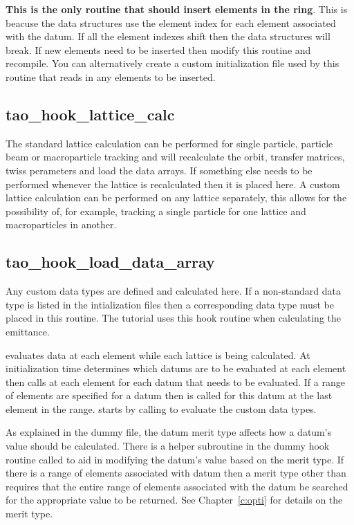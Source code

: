 \textbf{This is the only routine that should insert elements in the ring}. This
is beacuse the \tao data structures use the element index for each element
associated with the datum. If all the element indexes shift then the data
structures will break. If new elements need to be inserted then modify this
routine and recompile. You can alternatively create a custom initialization file
used by this routine that reads in any elements to be inserted.

\subsection{tao\_hook\_lattice\_calc}

The standard lattice calculation can be performed for single particle, particle
beam or macroparticle tracking and will recalculate the orbit, transfer
matrices, twiss perameters and load the data arrays. If something else needs to
be performed whenever the lattice is recalculated then it is placed here. A
custom lattice calculation can be performed on any lattice separately, this
allows for the possibility of, for example, tracking a single particle for one
lattice and macroparticles in another.

\subsection{tao\_hook\_load\_data\_array}

Any custom data types are defined and calculated here. If a non-standard data
type is listed in the intialization files then a corresponding data type must
be placed in this routine. The tutorial uses this hook routine when
calculating the emittance. 

\tao evaluates data at each element while each lattice is being calculated. At
initialization time \tao determines which datums are to be evaluated at each
element then calls  at each element for each datum that
needs to be evaluated. If a range of elements are specified for a datum then
 is called for this datum at the last element in the
range.  starts by calling 
to evaluate the custom data types. 

As explained in the dummy file, the datum merit type
affects how a datum's value should be calculated. There is a helper subroutine
in the dummy hook routine called  to aid in modifying the datum's value based on the
merit type. If there is a range of elements associated with datum then a merit
type other than  requires that the entire range of elements
associated with the datum be searched for the appropriate value to be returned.
See Chapter~\ref{c:opti} for details on the merit type. 

